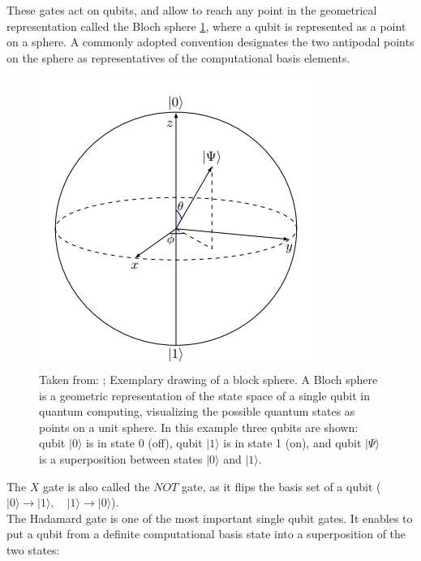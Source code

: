 \documentclass[twoside,twocolumn,9pt]{article}
\begin{document}
These gates act on qubits, and allow to reach any point in the geometrical representation called the Bloch sphere \cref{fig:block}, where a qubit is represented as a point on a sphere. A commonly adopted convention designates the two antipodal points on the sphere as representatives of the computational basis elements.

\begin{center}
  \begin{figure}
      \includegraphics[width=\linewidth]{block_sphere.png}
      \caption{Taken from: \cite{Silva2023}; Exemplary drawing of a block sphere. A Bloch sphere is a geometric representation of the state space of a single qubit in quantum computing, visualizing the possible quantum states as points on a unit sphere. In this example three qubits are shown: qubit $|0\rangle$ is in state 0 (off), qubit $|1\rangle$ is in state 1 (on), and qubit $|\Psi\rangle$ is a superposition between states $|0\rangle$ and $|1\rangle$.}
      \label{fig:block} 
  \end{figure}
\end{center}

The $X$ gate is also called the $NOT$ gate, as it flips the basis set of a qubit ($|0\rangle\rightarrow|1\rangle,\quad|1\rangle\rightarrow|0\rangle$).\\
The Hadamard gate is one of the most important single qubit gates. It enables to put a qubit from a definite computational basis state into a superposition of the two states:
\end{document}
